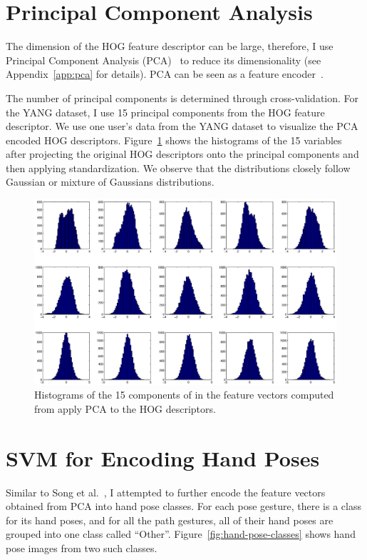\section{Principal Component Analysis}
The dimension of the HOG feature descriptor can be large, therefore, I use
Principal Component Analysis (PCA)~\cite{pca} to reduce its dimensionality (see
Appendix~\ref{app:pca} for details). PCA can be seen as a feature
encoder~\cite{ranzato07}.

The number of principal components is determined through cross-validation. For
the YANG dataset, I use 15 principal components from the HOG feature descriptor.
We use one user's data from the YANG dataset to visualize the PCA
encoded HOG descriptors. Figure~\ref{fig:pca} shows the histograms of the 15
variables after projecting the original HOG descriptors onto the principal
components and then applying standardization.
We observe that the distributions closely follow Gaussian or mixture of
Gaussians distributions.

\begin{figure}[tbh]
\includegraphics[width=\columnwidth]{figures/hist_pca.eps}
\caption{Histograms of the 15 components of in the feature vectors computed
from apply PCA to the HOG descriptors.}
\label{fig:pca}
\end{figure}

\section{SVM for Encoding Hand Poses}
Similar to Song et al.~\cite{song12}, I attempted to further encode the feature
vectors obtained from PCA into hand pose classes. For each pose
gesture, there is a class for its hand poses, and for all the path
gestures, all of their hand poses are grouped into one class called ``Other''.
Figure~\ref{fig:hand-pose-classes} shows hand pose images from two such classes.

